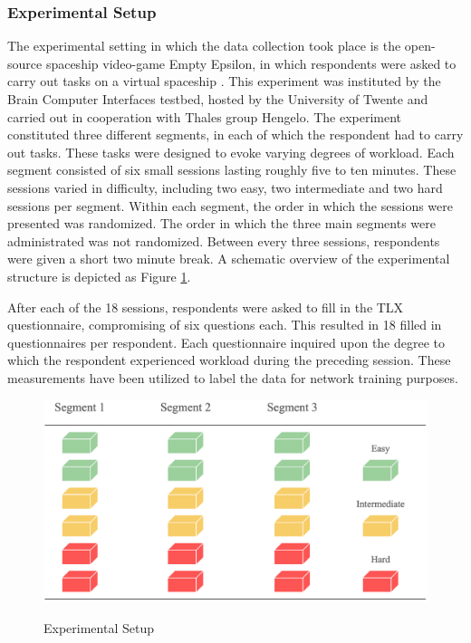 \documentclass[12pt]{article}
\begin{document}
\subsubsection{Experimental Setup}
The experimental setting in which the data collection took place is the open-source spaceship video-game Empty Epsilon, in which respondents were asked to carry out tasks on a virtual spaceship \cite{daid2016empty}. This experiment was instituted by the Brain Computer Interfaces testbed, hosted by the University of Twente and carried out in cooperation with Thales group Hengelo. The experiment constituted three different segments, in each of which the respondent had to carry out tasks. These tasks were designed to evoke varying degrees of workload. Each segment consisted of six small sessions lasting roughly five to ten minutes. These sessions varied in difficulty, including two easy, two intermediate and two hard sessions per segment. Within each segment, the order in which the sessions were presented was randomized. The order in which the three main segments were administrated was not randomized. Between every three sessions, respondents were given a short two minute break. A schematic overview of the experimental structure is depicted as Figure \ref{fig:experimental}. 

After each of the 18 sessions, respondents were asked to fill in the TLX questionnaire, compromising of six questions each. This resulted in 18 filled in questionnaires per respondent. Each questionnaire inquired upon the degree to which the respondent experienced workload during the preceding session. These measurements have been utilized to label the data for network training purposes. 

\begin{figure}
\caption{Experimental Setup}
\bigskip
\includegraphics[scale=0.4]{experimental_setup}
\label{fig:experimental}
\end{figure}
\end{document}
